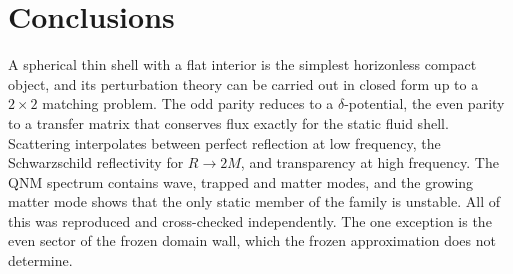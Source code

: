 \documentclass[11pt,a4paper]{article}
\numberwithin{equation}{section}
\begin{document}
\section{Conclusions}
A spherical thin shell with a flat interior is the simplest horizonless compact object, and its perturbation theory
can be carried out in closed form up to a $2\times2$ matching problem. The odd parity reduces to a $\delta$-potential,
the even parity to a transfer matrix that conserves flux exactly for the static fluid shell. Scattering interpolates
between perfect reflection at low frequency, the Schwarzschild reflectivity for $R\to2M$, and transparency at high
frequency. The QNM spectrum contains wave, trapped and matter modes, and the growing matter mode shows that the only
static member of the family is unstable. All of this was reproduced and cross-checked independently. The one
exception is the even sector of the frozen domain wall, which the frozen approximation does not determine.

\appendix
\end{document}
